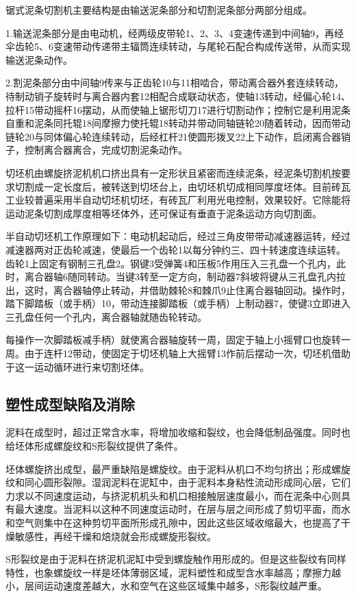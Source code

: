 \documentclass{ctexbook}
\begin{document}
锯式泥条切割机主要结构是由输送泥条部分和切割泥条部分两部分组成。

1.输送泥条部分是由电动机，经两级皮带轮1、2、3、4变速传递到中间轴9，再经伞齿轮5、6变速带动传递带主辐筒连续转动，与尾轮石配合构成传送带，从而实现输送泥条动作。

2.割泥条部分由中间轴9传来与正齿轮10与11相啮合，带动离合器外套连续转动，待制动销子旋转时与离合器内套12相配合成联动状态，使轴13转动，经偏心轮14、拉杆15带动摇杆16摆动，从而使轴上锯形切刀17进行切割动作；控制它是利用泥条自重和泥条同托辊18间摩擦力使托辊18转动并带动同轴链轮20随着转动，因而带动链轮20与同体偏心轮连续转动，后经杠杆21使圆形拨叉22上下动作，启闭离合器销子，控制离合器离合，完成切割泥条动作。

切坯机由螺旋挤泥机机口挤出具有一定形状且紧密而连续泥条，经泥条切割机按要求切割成一定长度后，被转送到切坯台上，由切坯机切成相同厚度坯体。目前砖瓦工业较普遍采用半自动切坯机切坯，有砖瓦厂利用光电控制，效果较好。它除能将运动泥条切割成厚度相等坯体外，还可保证有垂直于泥条运动方向切割面。

半自动切坯机工作原理如下：电动机起动后，经过三角皮带带动减速器运转，经过减速器两对正齿轮减速，使最后一个齿轮1以每分钟约三、四十转速度连续运转。齿轮1上固定有钢制三孔盘2。钢键3受弹簧4和压板5作用压入三孔盘一个孔内，此时，离合器轴6随同转动。当键3转至一定方向，制动器7斜坡将键从三孔盘孔内拉出，这时，离合器轴停止转动，并借助棘轮8和棘爪9止住离合器轴回动。操作时，踏下脚踏板（或手柄）10，带动连接脚踏板（或手柄）上制动器7，使键3立即进入三孔盘任何一个孔内，离合器轴就随齿轮转动。

每操作一次脚踏板减手柄）就使离合器轴旋转一周，固定于轴上小摇臂口也旋转一周。由于连杆12带动，使固定于切坯机轴上大摇臂13作前后摆动一次，切坯机借助于这一运动循环进行来切割坯体。
\subsection{塑性成型缺陷及消除}
泥料在成型时，超过正常含水率，将增加收缩和裂纹，也会降低制品强度。同时也给坯体形成螺旋纹和S形裂纹提供了条件。

坯体螺旋挤出成型，最严重缺陷是螺旋纹。由于泥料从机口不均匀挤出；形成螺旋纹和同心圆形裂隙。湿润泥料在泥缸中，由于泥料本身粘性流动形成同心层，它们力求以不同速度运动，与挤泥机机头和机口相接触层速度最小，而在泥条中心则具有最大速度。当泥料以这种不同速度运动时，在层与层之间形成了剪切平面，而水和空气则集中在这种剪切平面所形成孔隙中，因此这些区域收缩最大，也提高了干燥敏感性，再经干燥和焙烧就会形成螺旋形裂纹。

S形裂纹是由于泥料在挤泥机泥缸中受到螺旋触作用形成的。但是这些裂纹有同样特性，也象螺旋纹一样是坯体薄弱区域，泥料塑性和成型含水率越高；摩擦力越小，层间运动速度差越大，水和空气在这些区域集中越多，S形裂纹越严重。
\end{document}
